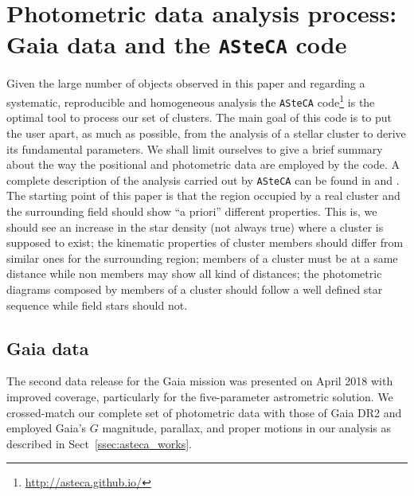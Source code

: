 \documentclass[draft]{aa}
\begin{document}
\section{Photometric data analysis process: Gaia data and the \texttt{ASteCA}
code}
\label{sec:photom_analysis}

Given the large number of objects observed in this paper and regarding a
systematic, reproducible and homogeneous analysis the \texttt{ASteCA}
code\footnote{\url{http://asteca.github.io/}} is the optimal tool
to process our set of clusters. The main goal of this code is to put the user
apart, as much as possible, from the analysis of a stellar cluster to derive
its fundamental parameters. We shall limit ourselves to give a brief summary
about the way the positional and photometric data are employed by the code.
A complete description of the analysis carried out by
\texttt{ASteCA} can be found in \cite{Perren_2015} and \cite{Perren_2017}.
The starting point of this paper is that the region occupied by a real cluster
and the surrounding field should show ``a priori'' different properties. This
is, we should see an increase in the star density (not always true) where a
cluster is supposed to exist; the kinematic properties of cluster members
should differ from similar ones for the surrounding region; members of a
cluster must be at a same distance while non members may show all kind of
distances; the photometric diagrams composed by members of a cluster should
follow a well defined star sequence while field stars should not. 



\subsection{Gaia data}
\label{ssec:gaia_data}

The second data release for the Gaia mission \citep{GaiaDR2_2018} was presented
on April 2018 with improved coverage, particularly for the five-parameter
astrometric solution.
We crossed-match our complete set of photometric data with those of Gaia DR2
and employed Gaia's $G$ magnitude, parallax, and proper motions in our
analysis as described in Sect~\ref{ssec:asteca_works}.
\end{document}

